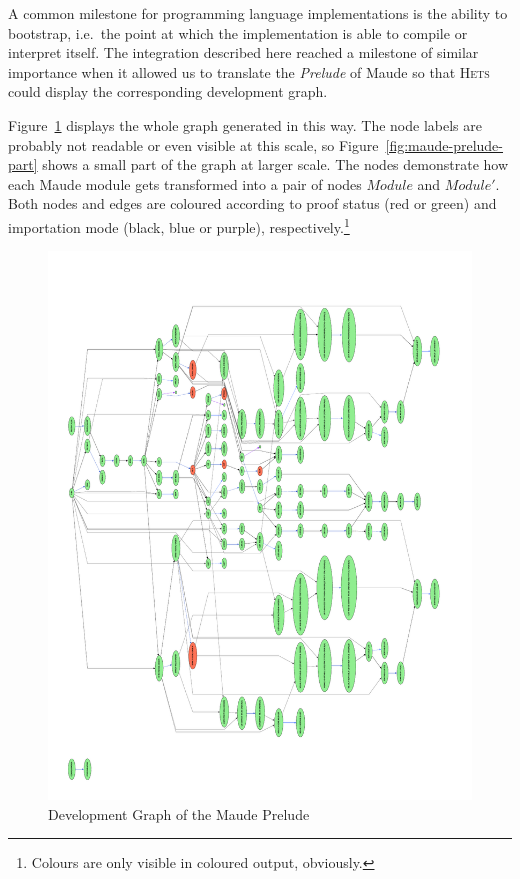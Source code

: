 \documentclass[11pt]{article}
\newcommand{\Hets}{\textsc{Hets}}
\begin{document}
A common milestone for programming language implementations is the ability to bootstrap, i.e.\ the point at which the implementation is able to compile or interpret itself. The integration described here reached a milestone of similar importance when it allowed us to translate the \emph{Prelude} of Maude so that \Hets{} could display the corresponding development graph.

Figure~\ref{fig:maude-prelude-all} displays the whole graph generated in this way. The node labels are probably not readable or even visible at this scale, so Figure~\ref{fig:maude-prelude-part} shows a small part of the graph at larger scale. The nodes demonstrate how each Maude module gets transformed into a pair of nodes $Module$ and $Module'$. Both nodes and edges are coloured according to proof status (red or green) and importation mode (black, blue or purple), respectively.\footnote{Colours are only visible in coloured output, obviously.}

\begin{figure}
  \includegraphics[width=\textwidth]{prelude-all.pdf}
  \caption{Development Graph of the Maude Prelude}\label{fig:maude-prelude-all}
\end{figure}
\end{document}

